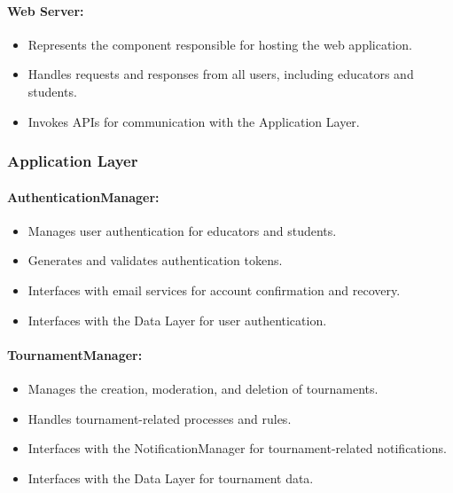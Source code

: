 \documentclass{article}
\begin{document}
\paragraph{Web Server:}

\begin{itemize}
    \item Represents the component responsible for hosting the web application.
    \item Handles requests and responses from all users, including educators and students.
    \item Invokes APIs for communication with the Application Layer.
\end{itemize}

\subsubsection{Application Layer}

\paragraph{AuthenticationManager:}

\begin{itemize}
    \item Manages user authentication for educators and students.
    \item Generates and validates authentication tokens.
    \item Interfaces with email services for account confirmation and recovery.
    \item Interfaces with the Data Layer for user authentication.
\end{itemize}

\paragraph{TournamentManager:}

\begin{itemize}
    \item Manages the creation, moderation, and deletion of tournaments.
    \item Handles tournament-related processes and rules.
    \item Interfaces with the NotificationManager for tournament-related notifications.
    \item Interfaces with the Data Layer for tournament data.
\end{itemize}
\end{document}
